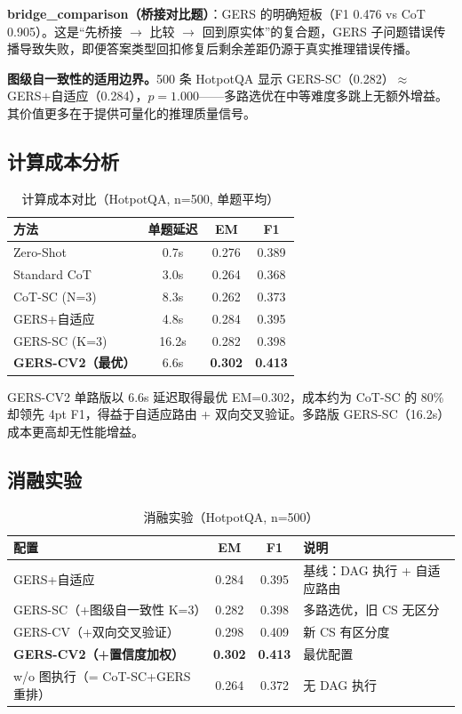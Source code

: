 \documentclass[11pt,a4paper]{ctexart}
\begin{document}
\textbf{bridge\_comparison（桥接对比题）}：GERS 的明确短板（F1 0.476 vs CoT 0.905）。这是``先桥接 $\to$ 比较 $\to$ 回到原实体''的复合题，GERS 子问题错误传播导致失败，即便答案类型回扣修复后剩余差距仍源于真实推理错误传播。

\textbf{图级自一致性的适用边界。}500 条 HotpotQA 显示 GERS-SC（0.282）$\approx$ GERS+自适应（0.284），$p=1.000$——多路选优在中等难度多跳上无额外增益。其价值更多在于提供可量化的推理质量信号。

\subsection{计算成本分析}

\begin{table}[h]
\centering
\caption{计算成本对比（HotpotQA, n=500, 单题平均）}
\begin{tabular}{lccc}
\toprule
方法 & 单题延迟 & EM & F1 \\
\midrule
Zero-Shot & 0.7s & 0.276 & 0.389 \\
Standard CoT & 3.0s & 0.264 & 0.368 \\
CoT-SC (N=3) & 8.3s & 0.262 & 0.373 \\
GERS+自适应 & 4.8s & 0.284 & 0.395 \\
GERS-SC (K=3) & 16.2s & 0.282 & 0.398 \\
\textbf{GERS-CV2（最优）} & 6.6s & \textbf{0.302} & \textbf{0.413} \\
\bottomrule
\end{tabular}
\end{table}

GERS-CV2 单路版以 6.6s 延迟取得最优 EM=0.302，成本约为 CoT-SC 的 80\% 却领先 4pt F1，得益于自适应路由 + 双向交叉验证。多路版 GERS-SC（16.2s）成本更高却无性能增益。

\subsection{消融实验}

\begin{table}[h]
\centering
\caption{消融实验（HotpotQA, n=500）}
\begin{tabular}{lccl}
\toprule
配置 & EM & F1 & 说明 \\
\midrule
GERS+自适应 & 0.284 & 0.395 & 基线：DAG 执行 + 自适应路由 \\
GERS-SC（+图级自一致性 K=3） & 0.282 & 0.398 & 多路选优，旧 CS 无区分 \\
GERS-CV（+双向交叉验证） & 0.298 & 0.409 & 新 CS 有区分度 \\
\textbf{GERS-CV2（+置信度加权）} & \textbf{0.302} & \textbf{0.413} & 最优配置 \\
w/o 图执行（= CoT-SC+GERS 重排） & 0.264 & 0.372 & 无 DAG 执行 \\
\bottomrule
\end{tabular}
\end{table}
\end{document}
